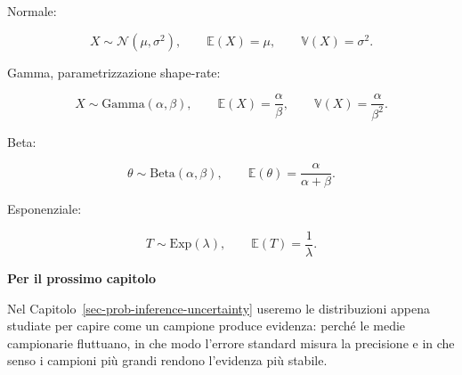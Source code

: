 \documentclass[
  italian,
  letterpaper,
  a4paper,
  11pt,
  open=any]{scrbook}
\theoremstyle{plain}
\theoremstyle{definition}
\theoremstyle{definition}
\theoremstyle{remark}
\begin{document}
\begin{tcolorbox}
Normale:

\[
X \sim \mathcal{N}(\mu,\sigma^2),
\qquad
\mathbb{E}(X)=\mu,
\qquad
\mathbb{V}(X)=\sigma^2.
\]

Gamma, parametrizzazione shape-rate:

\[
X \sim \mathrm{Gamma}(\alpha,\beta),
\qquad
\mathbb{E}(X)=\frac{\alpha}{\beta},
\qquad
\mathbb{V}(X)=\frac{\alpha}{\beta^2}.
\]

Beta:

\[
\theta \sim \mathrm{Beta}(\alpha,\beta),
\qquad
\mathbb{E}(\theta)=\frac{\alpha}{\alpha+\beta}.
\]

Esponenziale:

\[
T \sim \mathrm{Exp}(\lambda),
\qquad
\mathbb{E}(T)=\frac{1}{\lambda}.
\]

\textbf{Per il prossimo capitolo}

Nel Capitolo~\ref{sec-prob-inference-uncertainty} useremo le
distribuzioni appena studiate per capire come un campione produce
evidenza: perché le medie campionarie fluttuano, in che modo l'errore
standard misura la precisione e in che senso i campioni più grandi
rendono l'evidenza più stabile.

\end{tcolorbox}
\end{document}
